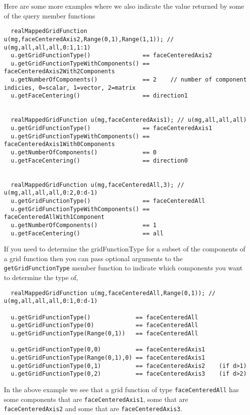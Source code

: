 Here are some more examples where we also indicate the value returned by some of the query member
functions
{\footnotesize  
\begin{verbatim} 
  realMappedGridFunction u(mg,faceCenteredAxis2,Range(0,1),Range(1,1)); // u(mg,all,all,all,0:1,1:1)
  u.getGridFunctionType()               == faceCenteredAxis2 
  u.getGridFunctionTypeWithComponents() == faceCenteredAxis2With2Components
  u.getNumberOfComponents()             == 2    // number of component indicies, 0=scalar, 1=vector, 2=matrix
  u.getFaceCentering()                  == direction1


  realMappedGridFunction u(mg,faceCenteredAxis1); // u(mg,all,all,all)
  u.getGridFunctionType()               == faceCenteredAxis1
  u.getGridFunctionTypeWithComponents() == faceCenteredAxis1With0Components
  u.getNumberOfComponents()             == 0
  u.getFaceCentering()                  == direction0


  realMappedGridFunction u(mg,faceCenteredAll,3); // u(mg,all,all,all,0:2,0:d-1)
  u.getGridFunctionType()               == faceCenteredAll
  u.getGridFunctionTypeWithComponents() == faceCenteredAllWith1Component
  u.getNumberOfComponents()             == 1
  u.getFaceCentering()                  == all
\end{verbatim}
}

If you need to determine the gridFunctionType for a subset of the components of a grid
function then you can pass optional arguments to the {\tt getGridFunctionType} member function
to indicate which components you want to determine the type of,
{\footnotesize  
\begin{verbatim} 
  realMappedGridFunction u(mg,faceCenteredAll,Range(0,1)); // u(mg,all,all,all,0:1,0:d-1)

  u.getGridFunctionType()             == faceCenteredAll
  u.getGridFunctionType(0)            == faceCenteredAll
  u.getGridFunctionType(Range(0,1))   == faceCenteredAll

  u.getGridFunctionType(0,0)          == faceCenteredAxis1
  u.getGridFunctionType(Range(0,1),0) == faceCenteredAxis1
  u.getGridFunctionType(0,1)          == faceCenteredAxis2    (if d>1)
  u.getGridFunctionType(0,2)          == faceCenteredAxis3    (if d>2)
\end{verbatim}
}
\noindent In the above example we see that a grid function of type {\tt faceCenteredAll} 
has some components that are {\tt faceCenteredAxis1}, some that are {\tt faceCenteredAxis2}
and some that are {\tt faceCenteredAxis3}.



